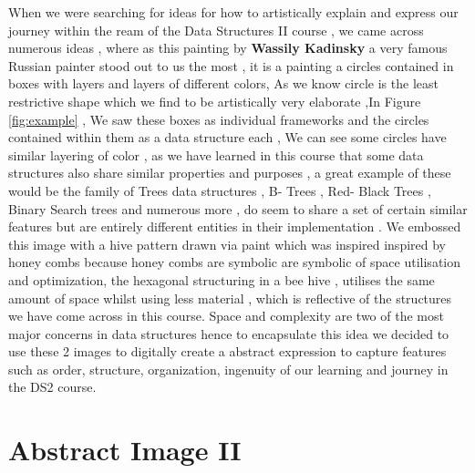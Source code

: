 \documentclass[addpoints]{exam}
\begin{document}
 When we were searching for ideas for how to artistically explain and express our journey within the ream of the Data Structures II course , we came across numerous ideas , where as this painting by \textbf{Wassily Kadinsky} a very famous Russian painter stood out to us the most , it is a painting a circles contained in boxes with layers and layers of different colors, As we know circle is the least restrictive shape which we find to be artistically very elaborate ,In Figure \ref{fig:example} ,  We saw these boxes as individual frameworks and the circles contained within them  as a data structure each , We can see some circles have similar layering of color , as we have learned in this course that some data structures also share similar properties and purposes , a great example of these would be the family of Trees data structures , B- Trees , Red- Black Trees , Binary Search trees and numerous more , do seem to share a set of certain similar features but are entirely different entities in their implementation . We embossed this image with a hive pattern drawn via paint which was inspired inspired by honey combs because honey combs are symbolic are symbolic of space utilisation and optimization, the hexagonal structuring in a bee hive , utilises the same amount of space whilst using less material , which is reflective of the structures we have come across in this course. Space and complexity are two of the most major concerns in data structures hence to encapsulate this idea we decided to use these 2 images to digitally create a abstract expression to capture features such as order, structure, organization, ingenuity of our learning and journey in the DS2 course. 

\section*{Abstract Image II}
\end{document}
